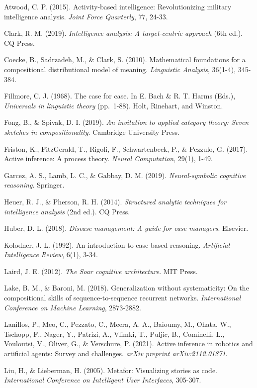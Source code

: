 \documentclass[
  11pt,
  letterpaper,
]{article}
\begin{document}
Atwood, C. P. (2015). Activity-based intelligence: Revolutionizing
military intelligence analysis. \emph{Joint Force Quarterly}, 77, 24-33.

Clark, R. M. (2019). \emph{Intelligence analysis: A target-centric
approach} (6th ed.). CQ Press.

Coecke, B., Sadrzadeh, M., \& Clark, S. (2010). Mathematical foundations
for a compositional distributional model of meaning. \emph{Linguistic
Analysis}, 36(1-4), 345-384.

Fillmore, C. J. (1968). The case for case. In E. Bach \& R. T. Harms
(Eds.), \emph{Universals in linguistic theory} (pp.~1-88). Holt,
Rinehart, and Winston.

Fong, B., \& Spivak, D. I. (2019). \emph{An invitation to applied
category theory: Seven sketches in compositionality}. Cambridge
University Press.

Friston, K., FitzGerald, T., Rigoli, F., Schwartenbeck, P., \& Pezzulo,
G. (2017). Active inference: A process theory. \emph{Neural
Computation}, 29(1), 1-49.

Garcez, A. S., Lamb, L. C., \& Gabbay, D. M. (2019).
\emph{Neural-symbolic cognitive reasoning}. Springer.

Heuer, R. J., \& Pherson, R. H. (2014). \emph{Structured analytic
techniques for intelligence analysis} (2nd ed.). CQ Press.

Huber, D. L. (2018). \emph{Disease management: A guide for case
managers}. Elsevier.

Kolodner, J. L. (1992). An introduction to case-based reasoning.
\emph{Artificial Intelligence Review}, 6(1), 3-34.

Laird, J. E. (2012). \emph{The Soar cognitive architecture}. MIT Press.

Lake, B. M., \& Baroni, M. (2018). Generalization without systematicity:
On the compositional skills of sequence-to-sequence recurrent networks.
\emph{International Conference on Machine Learning}, 2873-2882.

Lanillos, P., Meo, C., Pezzato, C., Meera, A. A., Baioumy, M., Ohata,
W., Tschopp, F., Nager, Y., Patrizi, A., Vlimki, T., Puljic, B.,
Cominelli, L., Vouloutsi, V., Oliver, G., \& Verschure, P. (2021).
Active inference in robotics and artificial agents: Survey and
challenges. \emph{arXiv preprint arXiv:2112.01871}.

Liu, H., \& Lieberman, H. (2005). Metafor: Visualizing stories as code.
\emph{International Conference on Intelligent User Interfaces}, 305-307.
\end{document}
